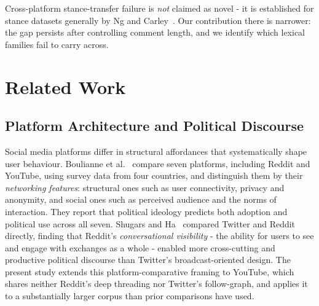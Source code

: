 \documentclass[pdflatex,sn-basic,Numbered,iicol]{sn-jnl}
\begin{document}
Cross-platform stance-transfer failure is \emph{not} claimed as novel - it is
established for stance datasets generally by Ng and Carley~\cite{ng2022}. Our
contribution there is narrower: the gap persists after controlling comment length,
and we identify which lexical families fail to carry across.

\section{Related Work}
\subsection{Platform Architecture and Political Discourse}
Social media platforms differ in structural affordances that systematically
shape user behaviour. Boulianne et al.~\cite{boulianne2025} compare seven
platforms, including Reddit and YouTube, using survey data from four countries,
and distinguish them by their \emph{networking features}: structural ones such
as user connectivity, privacy and anonymity, and social ones such as perceived
audience and the norms of interaction. They report that political ideology
predicts both adoption and political use across all seven. Shugars and Ha~\cite{shugars2025}
compared Twitter and Reddit directly, finding that Reddit's \emph{conversational
visibility} - the ability for users to see and engage with exchanges as a
whole - enabled more cross-cutting and productive political discourse than
Twitter's broadcast-oriented design. The present study extends this
platform-comparative framing to YouTube, which shares neither Reddit's deep
threading nor Twitter's follow-graph, and applies it to a substantially larger corpus than
prior comparisons have used.
\end{document}
